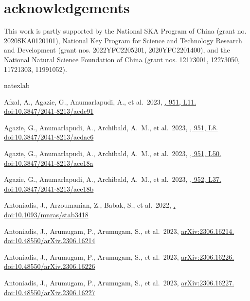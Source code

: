 \documentclass[twocolumn]{aastex631}
\begin{document}
\section*{acknowledgements}
%
This work is partly supported by the National SKA Program of China (grant no.
2020SKA0120101), National Key Program for Science and Technology Research and
Development (grant nos. 2022YFC2205201, 2020YFC2201400), and the National
Natural Science Foundation of China (grant nos. 12173001, 12273050, 11721303,
11991052). 
%

\begin{thebibliography}{0}
\expandafter\ifx\csname natexlab\endcsname\relax\def\natexlab#1{#1}\fi

Afzal, A., Agazie, G., Anumarlapudi, A., et al.\ 2023, 
\href{https://ui.adsabs.harvard.edu/abs/2023ApJ...951L..11A}
{\apjl, 951, L11. doi:10.3847/2041-8213/acdc91}

Agazie, G., Anumarlapudi, A., Archibald, A.~M., et al.\ 2023, 
\href{https://ui.adsabs.harvard.edu/abs/2023ApJ...951L...8A}
{\apjl, 951, L8. doi:10.3847/2041-8213/acdac6}

Agazie, G., Anumarlapudi, A., Archibald, A.~M., et al.\ 2023, 
\href{https://ui.adsabs.harvard.edu/abs/2023ApJ...951L..50A}
{\apjl, 951, L50. doi:10.3847/2041-8213/ace18a}

Agazie, G., Anumarlapudi, A., Archibald, A.~M., et al.\ 2023, 
\href{https://ui.adsabs.harvard.edu/abs/2023ApJ...952L..37A}
{\apjl, 952, L37. doi:10.3847/2041-8213/ace18b}

Antoniadis, J., Arzoumanian, Z., Babak, S., et al.\ 2022, 
\href{https://ui.adsabs.harvard.edu/abs/2022MNRAS.tmp...73A}
{\mnras. doi:10.1093/mnras/stab3418}

Antoniadis, J., Arumugam, P., Arumugam, S., et al.\ 2023, 
\href{https://ui.adsabs.harvard.edu/abs/2023arXiv230616214A}
{arXiv:2306.16214. doi:10.48550/arXiv.2306.16214}

Antoniadis, J., Arumugam, P., Arumugam, S., et al.\ 2023, 
\href{https://ui.adsabs.harvard.edu/abs/2023arXiv230616226A}
{arXiv:2306.16226. doi:10.48550/arXiv.2306.16226}

Antoniadis, J., Arumugam, P., Arumugam, S., et al.\ 2023, 
\href{https://ui.adsabs.harvard.edu/abs/2023arXiv230616227A}
{arXiv:2306.16227. doi:10.48550/arXiv.2306.16227}


\end{thebibliography}
\end{document}
